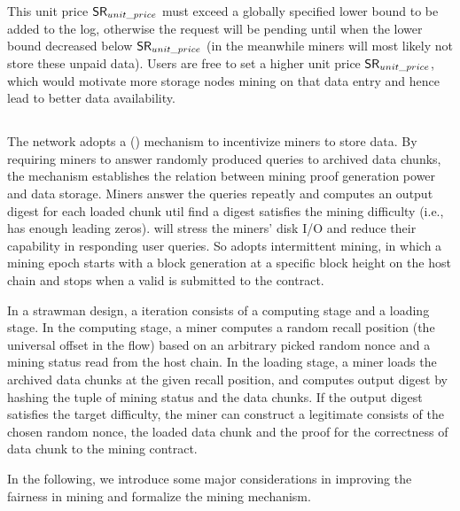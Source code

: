 This unit price $\mathsf{SR}_{unit\_price}$ must exceed a globally specified lower bound to be added to the log, otherwise the request will be pending until when the lower bound decreased below $\mathsf{SR}_{unit\_price}$ (in the meanwhile miners will most likely not store these unpaid data).
Users are free to set a higher unit price $\mathsf{SR}_{unit\_price}$,
which would motivate more storage nodes mining on that data entry and hence lead to better data availability.



\subsection{\proof}

The \project network adopts a \proof (\sproof) mechanism to incentivize miners to store data.
%
By requiring miners to answer randomly produced queries to archived data chunks, the \sproof mechanism establishes the relation between mining proof generation power and data storage.
%
Miners answer the queries repeatly and computes an output digest for each loaded chunk util find a digest satisfies the mining difficulty (i.e., has enough leading zeros). 
%
{\sproof} will stress the miners' disk I/O and reduce their capability in responding user queries.
%
So {\project} adopts intermittent mining, in which 
%
a mining epoch starts with a block generation at a specific block height on the host chain and stops when a valid {\sproof} is submitted to the {\project} contract. 

In a strawman design, a \sproof iteration consists of a computing stage and a loading stage. 
%
In the computing stage, a miner computes a random recall position (the universal offset in the flow) based on an arbitrary picked random nonce and a mining status read from the host chain.
%
In the loading stage, a miner loads the archived data chunks at the given recall position, and computes output digest by hashing the tuple of mining status and the data chunks. 
%
If the output digest satisfies the target difficulty, the miner can construct a legitimate \sproof consists of the chosen random nonce, the loaded data chunk and the proof for the correctness of data chunk to the mining contract. 

In the following, we introduce some major considerations in improving the fairness in {\sproof} mining and formalize the {\sproof} mining mechanism. 

%


